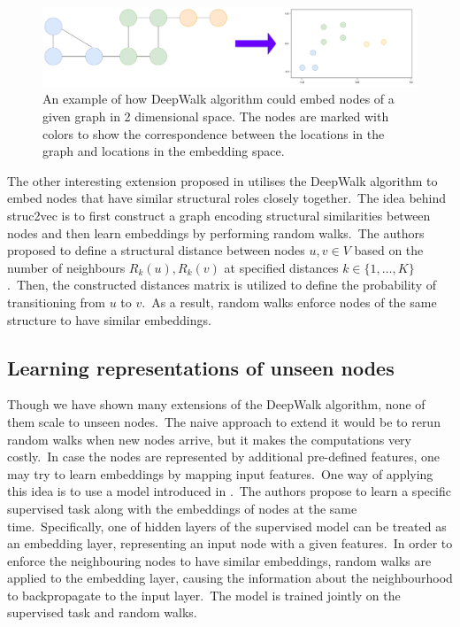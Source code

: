 \documentclass[longabstract, english, mgr]{iithesis}
\theoremstyle{default_theorem_style}\newtheorem{theorem}{Theorem}
\theoremstyle{default_theorem_style}\newtheorem{definition}{Definition}
\begin{document}
\begin{figure}[t]
\centering
\includegraphics[scale=0.23]{deepwalk}
\caption{An example of how DeepWalk algorithm could embed nodes of a given graph in 2 dimensional space. The nodes
are marked with colors to show the correspondence between the locations in the graph and locations in the embedding
space.}
\label{fig:deepwalk}
\end{figure}

\noindent The other interesting extension proposed in \cite{struc2vec} utilises the DeepWalk algorithm to embed
nodes that have similar structural roles closely together.\ The idea behind struc2vec is to first construct a
graph encoding structural similarities between nodes and then learn embeddings by performing random walks.\ The authors
proposed to define a structural distance between nodes $u, v \in V$ based on the number of neighbours
$R_k(u), R_k(v)$ at specified distances $k \in \{1, \dots, K\}$.\ Then, the constructed distances matrix is utilized
to define the probability of transitioning from $u$ to $v$.\ As a result, random walks enforce nodes of the same
structure to have similar embeddings.

\subsection{Learning representations of unseen nodes}

Though we have shown many extensions of the DeepWalk algorithm, none of them scale to unseen nodes.\ The naive approach
to extend it would be to rerun random walks when new nodes arrive, but it makes the computations very costly.\ In
case the nodes are represented by additional pre-defined features, one may try to learn embeddings by mapping input
features.\ One way of applying this idea is to use a model introduced in \cite{planetoid}.\ The authors propose to
learn a specific supervised task along with the embeddings of nodes at the same time.\ Specifically, one of hidden
layers of the supervised model can be treated as an embedding layer, representing an input node with a given
features.\ In order to enforce the neighbouring nodes to have similar embeddings, random walks are applied to
the embedding layer, causing the information about the neighbourhood to backpropagate to the input layer.\ The model is
trained jointly on the supervised task and random walks.\newline
\end{document}
